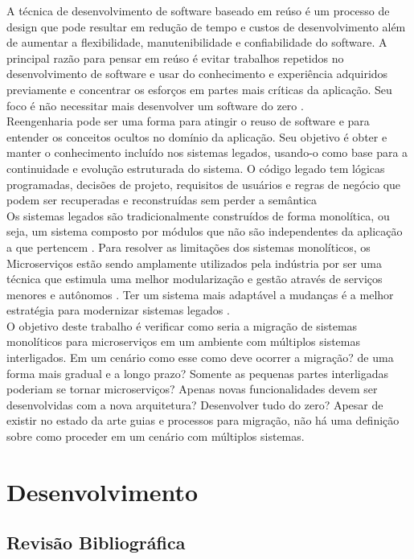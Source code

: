 \documentclass[12pt]{article}
\begin{document}
A técnica de desenvolvimento de software baseado em reúso é um processo de design que pode resultar em redução de tempo e custos de desenvolvimento além de aumentar a flexibilidade, manutenibilidade e confiabilidade do software. A principal razão para pensar em reúso é evitar trabalhos repetidos no desenvolvimento de software e usar do conhecimento e experiência adquiridos previamente e concentrar os esforços em partes mais críticas da aplicação. Seu foco é não necessitar mais desenvolver um software do zero \cite{Yang}.  
\\
Reengenharia pode ser uma forma para atingir o reuso de software e para entender os conceitos ocultos no domínio da aplicação. Seu objetivo é obter e manter o conhecimento incluído nos sistemas legados, usando-o como base para a continuidade e evolução estruturada do sistema. O código legado tem lógicas programadas, decisões de projeto, requisitos de usuários e regras de negócio que podem ser recuperadas e reconstruídas sem perder a semântica \cite{Garcia2004a}
\\
Os sistemas legados são tradicionalmente construídos de forma monolítica, ou seja, um sistema composto por módulos que não são independentes da aplicação a que pertencem \cite{Dragoni2017}. Para resolver as limitações dos sistemas monolíticos, os Microserviços estão sendo amplamente utilizados pela indústria por ser uma técnica que estimula uma melhor modularização e gestão através de serviços menores e autônomos \cite{Carvalho2019}. Ter um sistema mais adaptável a mudanças é a melhor estratégia para modernizar sistemas legados \cite{Kamimura2019a}.
\\
O objetivo deste trabalho é verificar como seria a migração de sistemas monolíticos para microserviços em um ambiente com múltiplos sistemas interligados. Em um cenário como esse como deve ocorrer a migração? de uma forma mais gradual e a longo prazo? Somente as pequenas partes interligadas poderiam se tornar microserviços? Apenas novas funcionalidades devem ser desenvolvidas com a nova arquitetura? Desenvolver tudo do zero? Apesar de existir no estado da arte guias e processos para migração, não há uma definição sobre como proceder em um cenário com múltiplos sistemas. 

\section{Desenvolvimento} \label{sec:firstpage}

\subsection{Revisão Bibliográfica}
\end{document}
